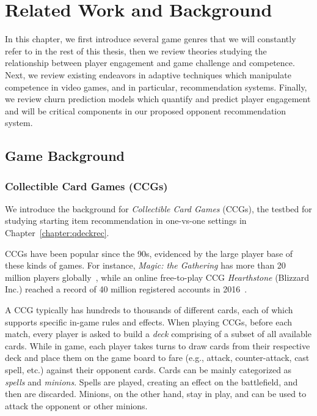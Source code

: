 \chapter{Related Work and Background} %

\label{chapter:relatework} %

In this chapter, we first introduce several game genres that we will constantly refer to in the rest of this thesis, then we review theories studying the relationship between player engagement and game challenge and competence. Next, we review existing endeavors in adaptive techniques which manipulate competence in video games, and in particular, recommendation systems. Finally, we review churn prediction models which quantify and predict player engagement and will be critical components in our proposed opponent recommendation system.

\section{Game Background}


\subsection{Collectible Card Games (CCGs)}\label{sec:background_ccg}
 We introduce the background for \textit{Collectible Card Games} (CCGs), the testbed for studying starting item recommendation in one-vs-one settings in Chapter~\ref{chapter:qdeckrec}.
 
CCGs have been popular since the 90s, evidenced by the large player base of these kinds of games. For instance, \textit{Magic: the Gathering} has more than 20 million players globally~\cite{guinnessmagic}, while an online free-to-play CCG \textit{Hearthstone} (Blizzard Inc.) reached a record of 40 million registered accounts in 2016~\cite{hearthstonepopular}.  

A CCG typically has hundreds to thousands of different cards, each of which supports specific in-game rules and effects. When playing CCGs, before each match, every player is asked to build a \textit{deck} comprising of a subset of all available cards. While in game, each player takes turns to draw cards from their respective deck and place them on the game board to fare (e.g., attack, counter-attack, cast spell, etc.) against their opponent cards. Cards can be mainly categorized as \textit{spells} and \textit{minions}. Spells are played, creating an effect on the battlefield, and then are discarded. Minions, on the other hand, stay in play, and can be used to attack the opponent or other minions. 

